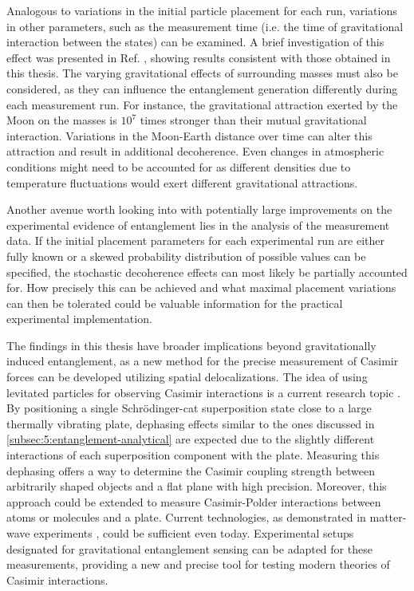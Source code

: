Analogous to variations in the initial particle placement for each run, variations in other parameters, such as the measurement time (i.e. the time of gravitational interaction between the states) can be examined.
A brief investigation of this effect was presented in Ref. \cite{Nguyen_2020}, showing results consistent with those obtained in this thesis.
The varying gravitational effects of surrounding masses must also be considered, as they can influence the entanglement generation differently during each measurement run. For instance, the gravitational attraction exerted by the Moon on the masses is $10^7$ times stronger than their mutual gravitational interaction.
Variations in the Moon-Earth distance over time can alter this attraction and result in additional decoherence.
Even changes in atmospheric conditions might need to be accounted for as different densities due to temperature fluctuations would exert different gravitational attractions.
 
Another avenue worth looking into with potentially large improvements on the experimental evidence of entanglement lies in the analysis of the measurement data.
If the initial placement parameters for each experimental run are either fully known or a skewed probability distribution of possible values can be specified, the stochastic decoherence effects can most likely be partially accounted for.
How precisely this can be achieved and what maximal placement variations can then be tolerated could be valuable information for the practical experimental implementation.

The findings in this thesis have broader implications beyond gravitationally induced entanglement, as a new method for the precise measurement of Casimir forces can be developed utilizing spatial delocalizations.
The idea of using levitated particles for observing Casimir interactions is a current research topic \cite{Xu_2024}.
By positioning a single Schrödinger-cat superposition state close to a large thermally vibrating plate, dephasing effects similar to the ones discussed in \cref{subsec:5:entanglement-analytical} are expected due to the slightly different interactions of each superposition component with the plate.
Measuring this dephasing offers a way to determine the Casimir coupling strength between arbitrarily shaped objects and a flat plane with high precision.
Moreover, this approach could be extended to measure Casimir-Polder interactions between atoms or molecules and a plate.
Current technologies, as demonstrated in matter-wave experiments \cite{Fein_2019}, could be sufficient even today.
Experimental setups designated for gravitational entanglement sensing can be adapted for these measurements, providing a new and precise tool for testing modern theories of Casimir interactions.



